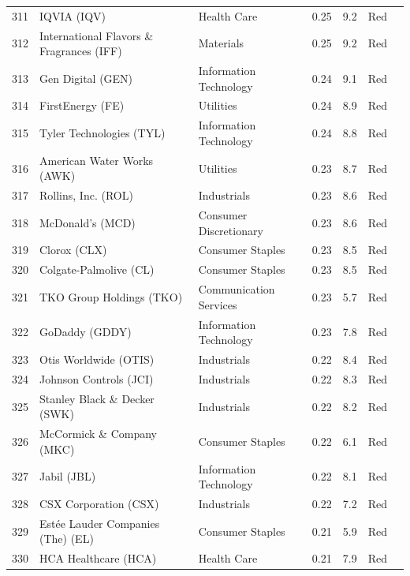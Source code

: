 \documentclass[11pt,a4paper]{article}
\begin{document}
{\begin{longtable}{r p{4.4cm} p{2.8cm} r r l l}
311 & IQVIA (IQV) & Health Care & 0.25 & 9.2 & \cellcolor[HTML]{F4B6B6}Red &  \\
312 & International Flavors \& Fragrances (IFF) & Materials & 0.25 & 9.2 & \cellcolor[HTML]{F4B6B6}Red &  \\
313 & Gen Digital (GEN) & Information Technology & 0.24 & 9.1 & \cellcolor[HTML]{F4B6B6}Red &  \\
314 & FirstEnergy (FE) & Utilities & 0.24 & 8.9 & \cellcolor[HTML]{F4B6B6}Red &  \\
315 & Tyler Technologies (TYL) & Information Technology & 0.24 & 8.8 & \cellcolor[HTML]{F4B6B6}Red &  \\
316 & American Water Works (AWK) & Utilities & 0.23 & 8.7 & \cellcolor[HTML]{F4B6B6}Red &  \\
317 & Rollins, Inc. (ROL) & Industrials & 0.23 & 8.6 & \cellcolor[HTML]{F4B6B6}Red &  \\
318 & McDonald's (MCD) & Consumer Discretionary & 0.23 & 8.6 & \cellcolor[HTML]{F4B6B6}Red &  \\
319 & Clorox (CLX) & Consumer Staples & 0.23 & 8.5 & \cellcolor[HTML]{F4B6B6}Red &  \\
320 & Colgate-Palmolive (CL) & Consumer Staples & 0.23 & 8.5 & \cellcolor[HTML]{F4B6B6}Red &  \\
321 & TKO Group Holdings (TKO) & Communication Services & 0.23 & 5.7 & \cellcolor[HTML]{F4B6B6}Red &  \\
322 & GoDaddy (GDDY) & Information Technology & 0.23 & 7.8 & \cellcolor[HTML]{F4B6B6}Red &  \\
323 & Otis Worldwide (OTIS) & Industrials & 0.22 & 8.4 & \cellcolor[HTML]{F4B6B6}Red &  \\
324 & Johnson Controls (JCI) & Industrials & 0.22 & 8.3 & \cellcolor[HTML]{F4B6B6}Red &  \\
325 & Stanley Black \& Decker (SWK) & Industrials & 0.22 & 8.2 & \cellcolor[HTML]{F4B6B6}Red &  \\
326 & McCormick \& Company (MKC) & Consumer Staples & 0.22 & 6.1 & \cellcolor[HTML]{F4B6B6}Red &  \\
327 & Jabil (JBL) & Information Technology & 0.22 & 8.1 & \cellcolor[HTML]{F4B6B6}Red &  \\
328 & CSX Corporation (CSX) & Industrials & 0.22 & 7.2 & \cellcolor[HTML]{F4B6B6}Red &  \\
329 & Estée Lauder Companies (The) (EL) & Consumer Staples & 0.21 & 5.9 & \cellcolor[HTML]{F4B6B6}Red &  \\
330 & HCA Healthcare (HCA) & Health Care & 0.21 & 7.9 & \cellcolor[HTML]{F4B6B6}Red &  \\

\end{longtable}}
\end{document}

